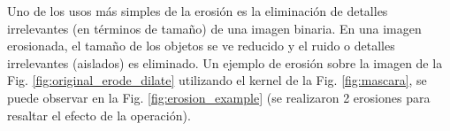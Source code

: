 Uno de los usos más simples de la erosión es la eliminación de detalles irrelevantes (en términos de tamaño) de una imagen binaria. En una imagen erosionada, el tamaño de los objetos se ve reducido y el ruido o detalles irrelevantes (aislados) es eliminado. Un ejemplo de erosión sobre la imagen de la Fig. \ref{fig:original_erode_dilate} utilizando el kernel de la Fig. \ref{fig:mascara}, se puede observar en la Fig. \ref{fig:erosion_example} (se realizaron 2 erosiones para resaltar el efecto de la operación).
% 
% 
% 
% 
% 
% 
